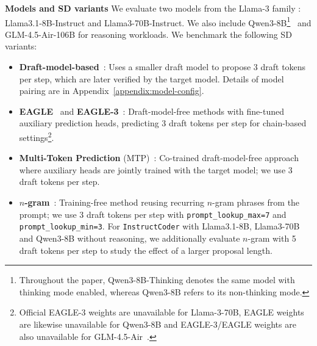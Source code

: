 \textbf{Models and SD variants}
We evaluate two models from the Llama-3 family \cite{dubey2024llama}:
Llama3.1-8B-Instruct and Llama3-70B-Instruct.
We also include Qwen3-8B\footnote{Throughout the paper, Qwen3-8B-Thinking denotes the same model with thinking mode enabled, whereas Qwen3-8B refers to its non-thinking mode.}~\cite{yang2025qwen3technicalreport} and GLM-4.5-Air-106B \cite{5team2025glm45agenticreasoningcoding} for reasoning workloads. We benchmark the following SD variants:
\begin{itemize} [leftmargin=1.5em, itemsep=0pt]
    \item \textbf{Draft-model-based}~\cite{leviathan2023fast, chen2023accelerating}: Uses a smaller draft model to propose 3 draft tokens per step, which are later verified by the target model. Details of model pairing are in Appendix~\autoref{appendix:model-config}.
  \item \textbf{EAGLE}~\cite{li2024eagle} and \textbf{EAGLE-3}~\cite{li2025eagle3}: Draft-model-free methods with fine-tuned auxiliary prediction heads, predicting 3 draft tokens per step for chain-based settings\footnote{Official EAGLE-3 weights are unavailable for Llama-3-70B, EAGLE weights are likewise unavailable for Qwen3-8B and EAGLE-3/EAGLE weights are also unavailable for GLM-4.5-Air~\cite{li2024eagle}.}.
  \item \textbf{Multi-Token Prediction} (MTP)~\cite{deepseekai2025deepseekv3technicalreport}: Co-trained draft-model-free approach where auxiliary heads are jointly trained with the target model; we use 3 draft tokens per step.
  \item \textbf{$n$-gram}~\cite{saxena2023prompt, somasundaram2024pld+}: Training-free method reusing recurring $n$-gram phrases from the prompt; we use 3 draft tokens per step with {\tt prompt\_lookup\_max=7} and {\tt prompt\_lookup\_min=3}. For \texttt{InstructCoder} with Llama3.1-8B, Llama3-70B and Qwen3-8B without reasoning, we additionally evaluate $n$-gram with 5 draft tokens per step to study the effect of a larger proposal length.
  
\end{itemize}



